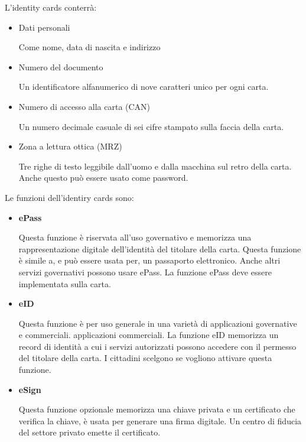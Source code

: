 \singlespacing

L'identity cards conterrà:

\begin{itemize}
    \item Dati personali 
    
    Come nome, data di nascita e indirizzo
    
    \item Numero del documento
    
    Un identificatore alfanumerico di nove caratteri unico per ogni carta.

    \item Numero di accesso alla carta (CAN)
    
    Un numero decimale casuale di sei cifre stampato sulla faccia della carta.
    
    \item Zona a lettura ottica (MRZ)
    
     Tre righe di testo leggibile dall'uomo e dalla macchina sul retro della carta. Anche questo può essere usato come password.
\end{itemize}
Le funzioni dell'identiry cards sono:
\begin{itemize}
    \item \textbf{ePass}
    
    Questa funzione è riservata all'uso governativo e memorizza una rappresentazione digitale dell'identità del titolare della carta. Questa funzione è simile a, e può essere usata per, un passaporto elettronico. Anche altri servizi governativi possono usare ePass. La funzione ePass deve essere implementata sulla carta.
    
    \item \textbf{eID}
    
    Questa funzione è per uso generale in una varietà di applicazioni governative e commerciali. applicazioni commerciali. La funzione eID memorizza un record di identità a cui i servizi autorizzati possono accedere con il permesso del titolare della carta. I cittadini scelgono se vogliono attivare questa funzione.
    
    \item \textbf{eSign}
    
    Questa funzione opzionale memorizza una chiave privata e un certificato che verifica la chiave, è usata per generare una firma digitale. Un centro di fiducia del settore privato emette il certificato.
    
\end{itemize}
